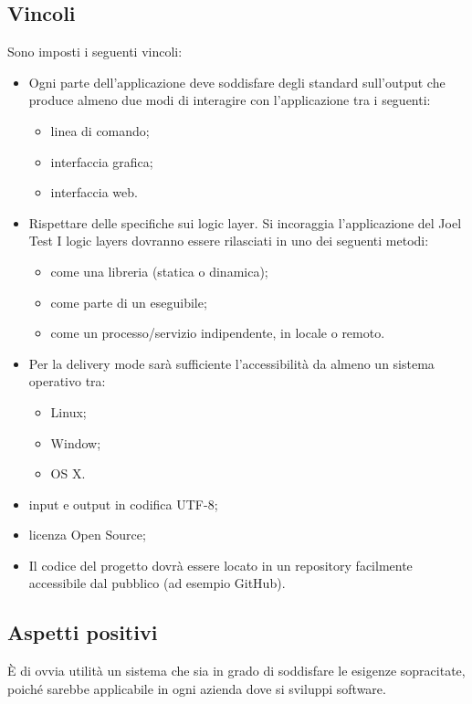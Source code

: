 \subsection{Vincoli}
Sono imposti i seguenti vincoli:
\begin{itemize}
\item Ogni parte dell'applicazione deve soddisfare degli standard sull'output che produce
almeno due modi di interagire con l'applicazione tra i seguenti:
\begin{itemize}
\item linea di comando;
\item interfaccia grafica;
\item interfaccia web.
\end{itemize}

\item Rispettare delle specifiche sui logic layer. Si incoraggia l'applicazione del Joel Test I logic layers dovranno essere rilasciati in uno dei seguenti metodi:
\begin{itemize}
\item come una libreria (statica o dinamica);
\item come parte di un eseguibile;
\item come un processo/servizio indipendente, in locale o remoto.
\end{itemize}

\item Per la delivery mode sarà sufficiente l'accessibilità da almeno un sistema operativo tra:
\begin{itemize}
\item Linux;
\item Window;
\item OS X.
\end{itemize}

\item input e output in codifica UTF-8;
\item licenza Open Source;
\item Il codice del progetto dovrà essere locato in un repository facilmente accessibile dal pubblico (ad esempio GitHub).
\end{itemize}

\subsection{Aspetti positivi}
\`E di ovvia utilit\`a un sistema che sia in grado di soddisfare le esigenze sopracitate, poich\'e sarebbe applicabile in ogni azienda dove si sviluppi software.

